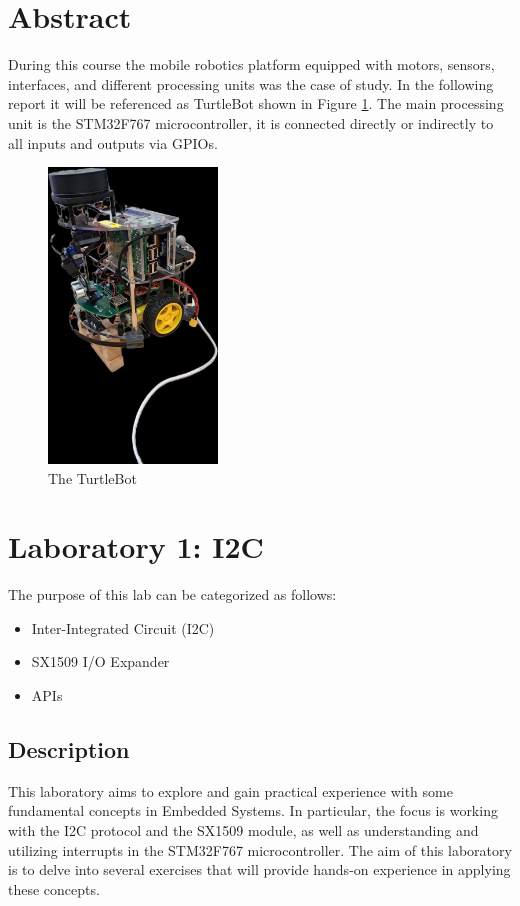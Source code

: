 \documentclass[english]{article}
\begin{document}
\begin{titlepage}
\end{titlepage}

\tableofcontents
\newpage
\section{Abstract}
During this course the mobile robotics platform equipped with motors, sensors, interfaces, and different processing units was the case of study. In the following report it will be referenced as TurtleBot shown in Figure \ref{fig:turtlebot}. The main processing unit is the STM32F767 microcontroller, it is connected directly or indirectly to all inputs and outputs via GPIOs.
\begin{figure}[!h]
	\centering
	\includegraphics[width=0.4\textwidth]{figures/turtlebot.jpg}
	\caption{The TurtleBot}
	\label{fig:turtlebot}
\end{figure}

\newpage
\section{Laboratory 1: I2C}
The purpose of this lab can be categorized as follows:
\begin{itemize}
    \item Inter-Integrated Circuit (I2C)
    \item SX1509 I/O Expander
    \item APIs
\end{itemize}

\subsection{Description}
This laboratory aims to explore and gain practical experience with some fundamental concepts in Embedded Systems.
 In particular, the focus is working with the I2C protocol and the SX1509 module, as well as understanding 
and utilizing interrupts in the STM32F767 microcontroller. The aim of this laboratory is to delve into several
 exercises that will provide hands-on experience in applying these concepts.
\end{document}
